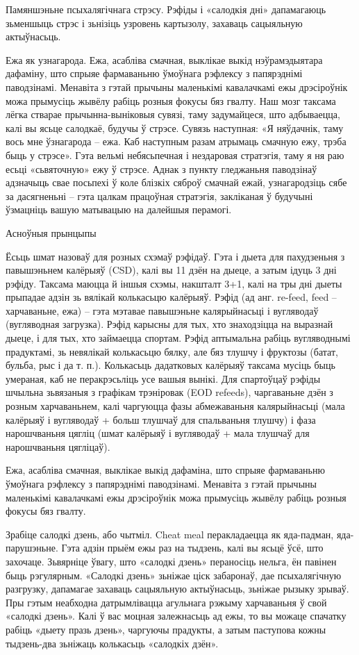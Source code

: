 Памяншэньне псыхалягічнага стрэсу.
Рэфіды і «салодкія дні» дапамагаюць зьменшыць стрэс і зьнізіць узровень картызолу, захаваць сацыяльную актыўнасьць.

Ежа як узнагарода.
Ежа, асабліва смачная, выклікае выкід нэўрамэдыятара дафаміну, што спрыяе фармаваньню ўмоўнага рэфлексу з папярэднімі паводзінамі. Менавіта з гэтай прычыны маленькімі кавалачкамі ежы дрэсіроўнік можа прымусіць жывёлу рабіць розныя фокусы бяз гвалту. Наш мозг таксама лёгка стварае прычынна-выніковыя сувязі, таму задумайцеся, што адбываецца, калі вы ясьце салодкаё, будучы ў стрэсе. Сувязь наступная: «Я няўдачнік, таму вось мне ўзнагарода – ежа. Каб наступным разам атрымаць смачную ежу, трэба быць у стрэсе». Гэта вельмі небясьпечная і нездаровая стратэгія, таму я ня раю есьці «сьвяточную» ежу ў стрэсе. Аднак з пункту гледжаньня паводзінаў адзначыць свае посьпехі ў коле блізкіх сяброў смачнай ежай, узнагародзіць сябе за дасягненьні – гэта цалкам працоўная стратэгія, закліканая ў будучыні ўзмацніць вашую матывацыю на далейшыя перамогі.

Асноўныя прынцыпы

Ёсьць шмат назоваў для розных схэмаў рэфідаў. Гэта і дыета для пахудзеньня з павышэньнем калёрыяў (CSD), калі вы 11 дзён на дыеце, а затым ідуць 3 дні рэфіду. Таксама маюцца й іншыя схэмы, накшталт 3+1, калі на тры дні дыеты прыпадае адзін зь вялікай колькасьцю калёрыяў.
Рэфід (ад анг. re-feed, feed – харчаваньне, ежа) – гэта мэтавае павышэньне калярыйнасьці і вугляводаў (вугляводная загрузка). Рэфід карысны для тых, хто знаходзіцца на выразнай дыеце, і для тых, хто займаецца спортам. Рэфід аптымальна рабіць вугляводнымі прадуктамі, зь невялікай колькасьцю бялку, але бяз тлушчу і фруктозы (батат, бульба, рыс і да т. п.). Колькасьць дадатковых калёрыяў таксама мусіць быць умераная, каб не перакрэсьліць усе вашыя вынікі.
Для спартоўцаў рэфіды шчыльна зьвязаныя з графікам трэніровак (EOD refeeds), чаргаваньне дзён з розным харчаваньнем, калі чаргуюцца фазы абмежаваньня калярыйнасьці (мала калёрыяў і вугляводаў + больш тлушчаў для спальваньня тлушчу) і фаза нарошчваньня цягліц (шмат калёрыяў і вугляводаў + мала тлушчаў для нарошчваньня цягліцаў).

Ежа, асабліва смачная, выклікае выкід дафаміна, што спрыяе фармаваньню ўмоўнага рэфлексу з папярэднімі паводзінамі. Менавіта з гэтай прычыны маленькімі кавалачкамі ежы дрэсіроўнік можа прымусіць жывёлу рабіць розныя фокусы бяз гвалту.

Зрабіце салодкі дзень, або чытміл.
Cheat meal перакладаецца як яда-падман, яда-парушэньне. Гэта адзін прыём ежы раз на тыдзень, калі вы ясьцё ўсё, што захочаце. Зьвярніце ўвагу, што «салодкі дзень» пераносіць нельга, ён павінен быць рэгулярным. «Салодкі дзень» зьніжае ціск забаронаў, дае псыхалягічную разгрузку, дапамагае захаваць сацыяльную актыўнасьць, зьніжае рызыку зрываў. Пры гэтым неабходна датрымлівацца агульнага рэжыму харчаваньня ў свой «салодкі дзень». Калі ў вас моцная залежнасьць ад ежы, то вы можаце спачатку рабіць «дыету празь дзень», чаргуючы прадукты, а затым паступова кожны тыдзень-два зьніжаць колькасьць «салодкіх дзён».

